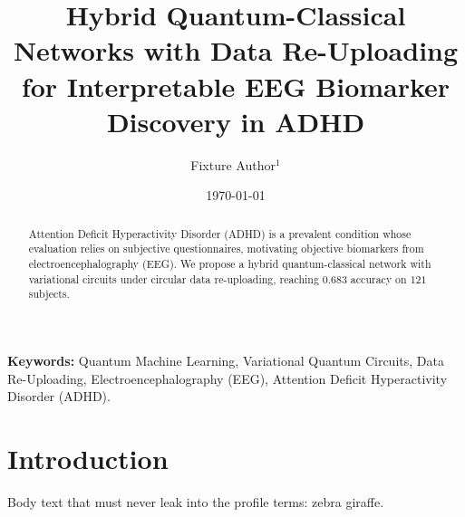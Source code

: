 \documentclass[10pt,twocolumn,a4paper]{article}
\title{\Large\textbf{Hybrid Quantum-Classical Networks with Data Re-Uploading for Interpretable EEG Biomarker Discovery in ADHD}}
\author{Fixture Author$^{1}$}
\date{\today}
\begin{document}
\maketitle

\begin{abstract}
Attention Deficit Hyperactivity Disorder (ADHD) is a prevalent condition whose evaluation relies on subjective questionnaires, motivating objective biomarkers from electroencephalography (EEG).
We propose a hybrid quantum-classical network with variational circuits under circular data re-uploading, reaching 0.683 accuracy on $121$ subjects.
\end{abstract}

\textbf{Keywords:} Quantum Machine Learning, Variational Quantum Circuits, Data Re-Uploading, Electroencephalography (EEG), Attention Deficit Hyperactivity Disorder (ADHD).

\section{Introduction}
Body text that must never leak into the profile terms: zebra giraffe.
\end{document}
